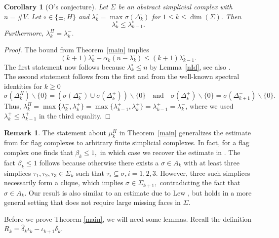\documentclass[10pt]{amsart}
\newtheorem{corollary}[theorem]{Corollary}
\theoremstyle{definition}
\newtheorem*{remark}{Remark}
\begin{document}
\begin{corollary}[O's conjecture]\label{conjecture}
    Let $\Sigma$ be an abstract simplicial complex with $n = \#V.$ Let $\circ\in\lbrace\pm,H\rbrace$ and $\lambda^\circ_k = \max\sigma(\Delta^\circ_k)$ for $1\leq k\leq\dim(\Sigma).$ Then
    \[\lambda^\circ_k\leq\lambda^\circ_{k-1}.\]
    Furthermore, $\lambda^H_k = \lambda^-_k.$  
\end{corollary}
\begin{proof}
    The bound from Theorem~\ref{main} implies
    \[(k+1)\lambda^\circ_k+\alpha_k(n-\lambda^\circ_k)\leq(k+1)\lambda^\circ_{k-1}.\]
    The first statement now follows because $\lambda^\circ_k\leq n$ by Lemma~\ref{nId},  see also \cite{DuvRei}.\\
    The second statement follows from the first and from the well-known spectral identities for $k\geq0$
    \[\sigma(\Delta^H_k)\backslash\lbrace0\rbrace = (\sigma(\Delta^-_k)\cup\sigma(\Delta^+_k))\backslash\lbrace0\rbrace\quad\text{and}\quad\sigma(\Delta^+_k)\backslash\lbrace 0\rbrace = \sigma(\Delta^-_{k+1})\backslash\lbrace 0\rbrace.\]
    Thus, $\lambda_k^H =\max\lbrace\lambda_k^-,\lambda_{k}^+\rbrace = \max\lbrace\lambda_{k-1}^+,\lambda_{k}^+\rbrace=\lambda_{k-1}^+=\lambda_k^-$, where we used $\lambda_k^+\leq\lambda_{k-1}^+$ in the third equality.\end{proof}

\begin{remark}
    The statement about $\mu^H_k$ in Theorem~\ref{main} generalizes the estimate from \cite[Theorem~1.1]{AharoniBergerMeshulam} for flag complexes to arbitrary finite simplicial complexes. In fact, for a flag complex one finds that $\beta_k\leq 1,$ in which case we recover the estimate in \cite[Theorem~1.1]{AharoniBergerMeshulam}. The fact $\beta_k\leq 1$ follows because otherwise there exists a $\sigma\in A_k$ with at least three simplices $\tau_1,\tau_2,\tau_3\in\Sigma_k$ such that $\tau_i\subseteq\sigma,i = 1,2,3.$ However, three such simplices necessarily form a clique, which implies $\sigma\in\Sigma_{k+1},$ contradicting the fact that $\sigma\in A_k.$ Our result is also similar to an estimate due to Lew \cite{lewgaps}, but holds in a more general setting that does not require large missing faces in $\Sigma.$
\end{remark}

Before we prove Theorem \ref{main}, we will need some lemmas. Recall the definition $R_k = \widehat\delta_k\iota_k-\iota_{k+1}\delta_k.$
\end{document}
